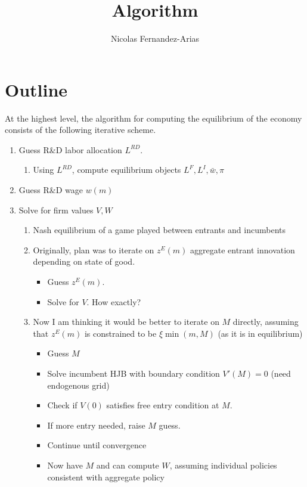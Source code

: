 \documentclass[12pt,english]{article}
\theoremstyle{remark}
\begin{document}
	
	
\title{Algorithm}
\author{Nicolas Fernandez-Arias}
\maketitle
	
\section{Outline}

At the highest level, the algorithm for computing the equilibrium of the economy consists of the following iterative scheme. 

\begin{enumerate}
	\item Guess R\&D labor allocation $L^{RD}$.
	\begin{enumerate}
		\item Using $L^{RD}$, compute equilibrium objects $L^F,L^I,\bar{w},\pi$
	\end{enumerate}
	\item Guess R\&D wage $w(m)$
	\item Solve for firm values $V,W$ 
	\begin{enumerate}
		\item Nash equilibrium of a game played between entrants and incumbents
		\item Originally, plan was to iterate on $z^E(m)$ aggregate entrant innovation depending on state of good. 
		\begin{itemize}
			\item Guess $z^E(m)$.
			\item Solve for $V$. How exactly? 
		\end{itemize}
		\item Now I am thinking it would be better to iterate on $M$ directly, assuming that $z^E(m)$ is constrained to be $\xi \min(m,M)$ (as it is in equilibrium)
		\begin{itemize}
			\item Guess $M$
			\item Solve incumbent HJB with boundary condition $V'(M) = 0$ (need endogenous grid)
			\item Check if $V(0)$ satisfies free entry condition at $M$.
			\item If more entry needed, raise $M$ guess. 
			\item Continue until convergence
			\item Now have $M$ and can compute $W$, assuming individual policies consistent with aggregate policy

\end{itemize}
\end{enumerate}
\end{enumerate}
\end{document}
